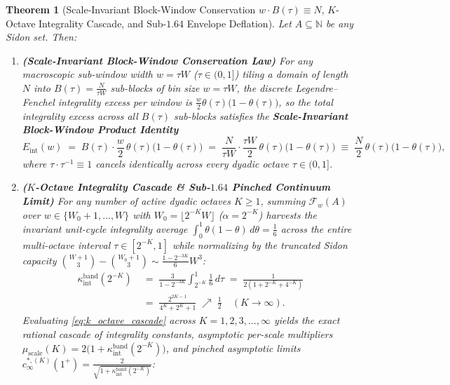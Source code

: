 \documentclass[11pt,reqno]{amsart}
\newtheorem{theorem}{Theorem}[section]
\theoremstyle{definition}
\theoremstyle{remark}
\begin{document}
\begin{theorem}[Scale-Invariant Block-Window Conservation $w \cdot B(\tau) \equiv N$, $K$-Octave Integrality Cascade, and Sub-$1.64$ Envelope Deflation]\label{thm:multioctave_cascade}
Let $A \subseteq \mathbb{N}$ be any Sidon set. Then:
\begin{enumerate}
  \item[\textup{(a)}] \textbf{(Scale-Invariant Block-Window Conservation Law)} For any macroscopic sub-window width $w = \tau W$ ($\tau \in (0, 1]$) tiling a domain of length $N$ into $B(\tau) = \frac{N}{\tau W}$ sub-blocks of bin size $w = \tau W$, the discrete Legendre--Fenchel integrality excess per window is $\frac{w}{2}\theta(\tau)\bigl(1 - \theta(\tau)\bigr)$, so the total integrality excess across all $B(\tau)$ sub-blocks satisfies the \textbf{Scale-Invariant Block-Window Product Identity}
  \begin{equation}\label{eq:scale_invariant_block_window}
    E_{\mathrm{int}}(w) \;=\; B(\tau) \cdot \frac{w}{2}\,\theta(\tau)\bigl(1 - \theta(\tau)\bigr) \;=\; \frac{N}{\tau W} \cdot \frac{\tau W}{2}\,\theta(\tau)\bigl(1 - \theta(\tau)\bigr) \;\equiv\; \frac{N}{2}\,\theta(\tau)\bigl(1 - \theta(\tau)\bigr),
  \end{equation}
  where $\tau \cdot \tau^{-1} \equiv 1$ cancels identically across every dyadic octave $\tau \in (0, 1]$.
  \item[\textup{(b)}] \textbf{($K$-Octave Integrality Cascade \& Sub-$1.64$ Pinched Continuum Limit)} For any number of active dyadic octaves $K \ge 1$, summing $\mathcal{F}_w(A)$ over $w \in \{W_0 + 1, \dots, W\}$ with $W_0 = \lfloor 2^{-K} W \rfloor$ ($\alpha = 2^{-K}$) harvests the invariant unit-cycle integrality average $\int_0^1 \theta(1 - \theta)\,d\theta = \frac{1}{6}$ across the entire multi-octave interval $\tau \in [2^{-K}, 1]$ while normalizing by the truncated Sidon capacity $\binom{W + 1}{3} - \binom{W_0 + 1}{3} \sim \frac{1 - 2^{-3K}}{6}W^3$:
  \begin{equation}\label{eq:k_octave_cascade}
    \begin{aligned}
      \kappa_{\mathrm{int}}^{\mathrm{band}}(2^{-K}) &\;=\; \frac{3}{1 - 2^{-3K}}\int_{2^{-K}}^1 \frac{1}{6}\,d\tau \;=\; \frac{1}{2(1 + 2^{-K} + 4^{-K})} \\
      &\;=\; \frac{2^{2K - 1}}{4^K + 2^K + 1} \;\nearrow\; \frac{1}{2} \quad (K \to \infty).
    \end{aligned}
  \end{equation}
  Evaluating \eqref{eq:k_octave_cascade} across $K = 1, 2, 3, \dots, \infty$ yields the exact rational cascade of integrality constants, asymptotic per-scale multipliers $\mu_{\mathrm{scale}}(K) = 2\bigl(1 + \kappa_{\mathrm{int}}^{\mathrm{band}}(2^{-K})\bigr)$, and pinched asymptotic limits $c_\infty^{*,(K)}(1^+) = \frac{2}{\sqrt{1 + \kappa_{\mathrm{int}}^{\mathrm{band}}(2^{-K})}}$:

\end{enumerate}
\end{theorem}
\end{document}
